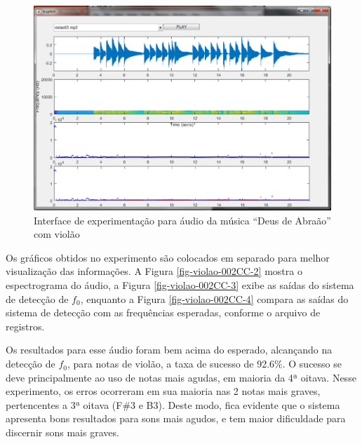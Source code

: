 \begin{figure}
	\centering
	\includegraphics[width=0.75\linewidth]{pasta1_figuras/violao-002CC.png}
	\caption{Interface de experimentação para áudio da música ``Deus de Abraão'' com violão}
	\label{fig-violao-002CC}
\end{figure}

Os gráficos obtidos no experimento são colocados em separado para melhor visualização das informações. A Figura \ref{fig-violao-002CC-2} mostra o espectrograma do áudio, a Figura \ref{fig-violao-002CC-3} exibe as saídas do sistema de detecção de $f_0$, enquanto a Figura \ref{fig-violao-002CC-4} compara as saídas do sistema de detecção com as frequências esperadas, conforme o arquivo de registros.


Os resultados para esse áudio foram bem acima do esperado, alcançando na detecção de $f_0$, para notas de violão, a taxa de sucesso de 92.6\%. O sucesso se deve principalmente ao uso de notas mais agudas, em maioria da 4ª oitava. Nesse experimento, os erros ocorreram em sua maioria nas 2 notas mais graves, pertencentes a 3ª oitava (F\#3 e B3). Deste modo, fica evidente que o sistema apresenta bons resultados para sons mais agudos, e tem maior dificuldade para discernir sons mais graves.

